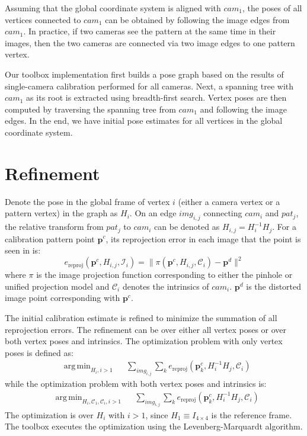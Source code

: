 \documentclass{report}
\DeclareMathOperator*{\argmin}{arg\,min}
\begin{document}
Assuming that the global coordinate system is aligned with $cam_1$, the poses of all vertices connected to $cam_1$ can be obtained by following the image edges from $cam_1$. In practice, if two cameras see the pattern at the same time in their images, then the two cameras are connected via two image edges to one pattern vertex. 

Our toolbox implementation first builds a pose graph based on the results of single-camera calibration performed for all cameras. Next, a spanning tree with $cam_1$ as its root is extracted using breadth-first search. Vertex poses are then computed by traversing the spanning tree from $cam_1$ and following the image edges. In the end, we have initial pose estimates for all vertices in the global coordinate system.

\section{Refinement}
Denote the pose in the global frame of vertex $i$ (either a camera vertex or a pattern vertex) in the graph as $H_i$. On an edge $img_{i, j}$ connecting $cam_i$ and $pat_j$, the relative transform from $pat_j$ to $cam_i$ can be denoted as $H_{i, j} = H_i^{-1} H_j$. For a calibration pattern point $\mathbf{p}^c$, its reprojection error in each image that the point is seen in is: 
\begin{equation}
e_{\textrm{reproj}}(\mathbf{p}^c, H_{i, j}, \mathcal{I}_i) = \|\pi(\mathbf{p}^c, H_{i, j}, \mathcal{C}_i) - \mathbf{p}^d\|^2
\end{equation}
where $\pi$ is the image projection function corresponding to either the pinhole or unified projection model and $\mathcal{C}_i$ denotes the intrinsics of $cam_i$. $\mathbf{p}^d$ is the distorted image point corresponding with $\mathbf{p}^c$. 

The initial calibration estimate is refined to minimize the summation of all reprojection errors. The refinement can be over either all vertex poses or over both vertex poses and intrinsics. The optimization problem with only vertex poses is defined as: 
\begin{equation}
\begin{aligned}
& \argmin_{H_i, i > 1} & & \sum_{img_{i, j}} \sum_{k} e_{\textrm{reproj}}(\mathbf{p}^c_k, H_i^{-1} H_j, \mathcal{C}_i) 
\end{aligned}
\end{equation}
while the optimization problem with both vertex poses and intrinsics is: 
\begin{equation}
\begin{aligned}
& \argmin_{H_i, \mathcal{C}_1, \mathcal{C}_i, i > 1} & & \sum_{img_{i, j}} \sum_{k} e_{\textrm{reproj}}(\mathbf{p}^c_k, H_i^{-1} H_j, \mathcal{C}_i) 
\end{aligned}
\end{equation}
The optimization is over $H_i$ with $i > 1$, since $H_1 \equiv I_{4 \times 4}$ is the reference frame. The toolbox executes the optimization using the Levenberg-Marquardt algorithm. 
\end{document}
